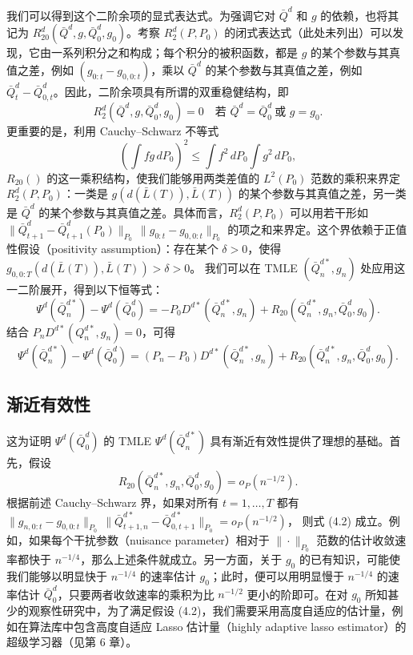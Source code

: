 我们可以得到这个二阶余项的显式表达式。为强调它对 $\bar Q^d$ 和 $g$ 的依赖，也将其记为 $R_{20}^d(\bar Q^d,g,\bar Q_0^d,g_0)$。考察 $R_2^d(P,P_0)$ 的闭式表达式（此处未列出）可以发现，它由一系列积分之和构成；每个积分的被积函数，都是 $g$ 的某个参数与其真值之差，例如 $(g_{0:t}-g_{0,0:t})$，乘以 $\bar Q^d$ 的某个参数与其真值之差，例如 $\bar Q_t^d-\bar Q_{0,t}^d$。因此，二阶余项具有所谓的双重稳健结构，即
\[
 R_2^d(\bar Q^d,g,\bar Q_0^d,g_0)=0
 \quad\text{若 }\bar Q^d=\bar Q_0^d\ \text{或 }g=g_0.
\]
更重要的是，利用 Cauchy--Schwarz 不等式
\[
 \left(\int fg\,dP_0\right)^2
 \leq \int f^2\,dP_0\int g^2\,dP_0,
\]
$R_{20}()$ 的这一乘积结构，使我们能够用两类差值的 $L^2(P_0)$ 范数的乘积来界定 $R_2^d(P,P_0)$：一类是 $g(d(\bar L(T)),\bar L(T))$ 的某个参数与其真值之差，另一类是 $\bar Q^d$ 的某个参数与其真值之差。具体而言，$R_2^d(P,P_0)$ 可以用若干形如
$\|\bar Q_{t+1}^d-\bar Q_{t+1}^d(P_0)\|_{P_0}\,
 \|g_{0:t}-g_{0,0:t}\|_{P_0}$
的项之和来界定。这个界依赖于正值性假设（positivity assumption）：存在某个 $\delta>0$，使得
$g_{0,0:T}(d(\bar L(T)),\bar L(T))>\delta>0$。
我们可以在 TMLE $(\bar Q_n^{d*},g_n)$ 处应用这一二阶展开，得到以下恒等式：
\[
 \Psi^d(\bar Q_n^{d*})-\Psi^d(\bar Q_0^d)
 =-P_0D^{d*}(\bar Q_n^{d*},g_n)
  +R_{20}(\bar Q_n^{d*},g_n,\bar Q_0^d,g_0).
\]
结合 $P_nD^{d*}(Q_n^{d*},g_n)=0$，可得
\begin{equation}
 \Psi^d(\bar Q_n^{d*})-\Psi^d(\bar Q_0^d)
 =(P_n-P_0)D^{d*}(\bar Q_n^{d*},g_n)
  +R_{20}(\bar Q_n^{d*},g_n,\bar Q_0^d,g_0).
 \tag{4.1}
\end{equation}

\subsection{渐近有效性}
\label{subsec:ch04-asymptotic-efficiency}

这为证明 $\Psi^d(\bar Q_0^d)$ 的 TMLE $\Psi^d(\bar Q_n^{d*})$ 具有渐近有效性提供了理想的基础。首先，假设
\begin{equation}
 R_{20}(\bar Q_n^{d*},g_n,\bar Q_0^d,g_0)=o_P(n^{-1/2}).
 \tag{4.2}
\end{equation}
根据前述 Cauchy--Schwarz 界，如果对所有 $t=1,\ldots,T$ 都有
$\|g_{n,0:t}-g_{0,0:t}\|_{P_0}\,
 \|\bar Q_{t+1,n}^{d*}-\bar Q_{0,t+1}^{d*}\|_{P_0}
 =o_P(n^{-1/2})$，
则式 (4.2) 成立。例如，如果每个干扰参数（nuisance parameter）相对于 $\|\cdot\|_{P_0}$ 范数的估计收敛速率都快于 $n^{-1/4}$，那么上述条件就成立。另一方面，关于 $g_0$ 的已有知识，可能使我们能够以明显快于 $n^{-1/4}$ 的速率估计 $g_0$；此时，便可以用明显慢于 $n^{-1/4}$ 的速率估计 $\bar Q_0^d$，只要两者收敛速率的乘积为比 $n^{-1/2}$ 更小的阶即可。在对 $g_0$ 所知甚少的观察性研究中，为了满足假设 (4.2)，我们需要采用高度自适应的估计量，例如在算法库中包含高度自适应 Lasso 估计量（highly adaptive lasso estimator）的超级学习器（见第 6 章）。

